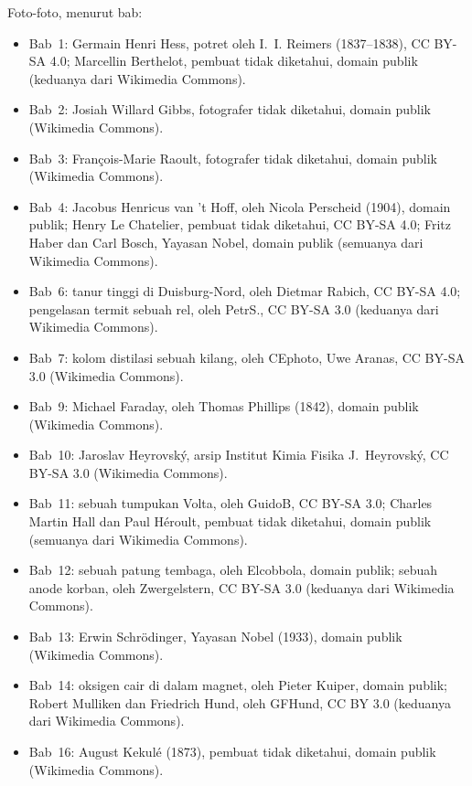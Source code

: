 \bigskip
\noindent Foto-foto, menurut bab:
\begin{itemize}\small
  \item Bab~1: Germain Henri Hess, potret oleh I.~I. Reimers (1837--1838),
        CC BY-SA 4.0; Marcellin Berthelot, pembuat tidak diketahui, domain
        publik (keduanya dari Wikimedia Commons).
  \item Bab~2: Josiah Willard Gibbs, fotografer tidak diketahui, domain
        publik (Wikimedia Commons).
  \item Bab~3: François-Marie Raoult, fotografer tidak diketahui, domain
        publik (Wikimedia Commons).
  \item Bab~4: Jacobus Henricus van 't Hoff, oleh Nicola Perscheid (1904),
        domain publik; Henry Le Chatelier, pembuat tidak diketahui, CC BY-SA
        4.0; Fritz Haber dan Carl Bosch, Yayasan Nobel, domain publik
        (semuanya dari Wikimedia Commons).
  \item Bab~6: tanur tinggi di Duisburg-Nord, oleh Dietmar Rabich, CC BY-SA
        4.0; pengelasan termit sebuah rel, oleh PetrS., CC BY-SA 3.0
        (keduanya dari Wikimedia Commons).
  \item Bab~7: kolom distilasi sebuah kilang, oleh CEphoto, Uwe Aranas,
        CC BY-SA 3.0 (Wikimedia Commons).
  \item Bab~9: Michael Faraday, oleh Thomas Phillips (1842), domain publik
        (Wikimedia Commons).
  \item Bab~10: Jaroslav Heyrovsk\'y, arsip Institut Kimia Fisika
        J.~Heyrovsk\'y, CC BY-SA 3.0 (Wikimedia Commons).
  \item Bab~11: sebuah tumpukan Volta, oleh GuidoB, CC BY-SA 3.0; Charles
        Martin Hall dan Paul H\'eroult, pembuat tidak diketahui, domain
        publik (semuanya dari Wikimedia Commons).
  \item Bab~12: sebuah patung tembaga, oleh Elcobbola, domain publik;
        sebuah anode korban, oleh Zwergelstern, CC BY-SA 3.0 (keduanya dari
        Wikimedia Commons).
  \item Bab~13: Erwin Schr\"odinger, Yayasan Nobel (1933), domain publik
        (Wikimedia Commons).
  \item Bab~14: oksigen cair di dalam magnet, oleh Pieter Kuiper, domain
        publik; Robert Mulliken dan Friedrich Hund, oleh GFHund, CC BY 3.0
        (keduanya dari Wikimedia Commons).
  \item Bab~16: August Kekul\'e (1873), pembuat tidak diketahui, domain
        publik (Wikimedia Commons).

\end{itemize}

